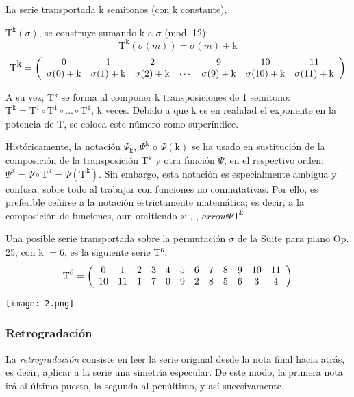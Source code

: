 		La serie transportada k semitonos (con k constante),
		
		$\mbox{T}^{{\mbox{k}}}(\sigma)$, se construye sumando k a $\sigma$ (mod. 12):
		\[\mbox{T}^{{\mbox{k}}}(\sigma(m))=\sigma(m)+{\mbox{k}}\]		
		{\[
		\mbox{T}^{{\mbox{k}}}=
		\left(\begin{array}{*{7}c}
			0&1&2&&9&10&11\\
			\sigma(0)+{\mbox{k}}&\sigma(1)+{\mbox{k}}&\sigma(2)+{\mbox{k}}&
			\cdots&
			\sigma(9)+{\mbox{k}}&\sigma(10)+{\mbox{k}}&\sigma(11)+{\mbox{k}}\\
		\end{array}\right)
		\]}
		
		A su vez, T$^{\mbox{k}}$ se forma al componer k transposiciones de 1 semitono: $\mbox{T}^{\mbox{k}}=\mbox{T}^1\circ\mbox{T}^1\circ\ldots\circ\mbox{T}^1$, k veces. Debido a que k es en realidad el exponente en la potencia de T, se coloca este n\'umero como super\'indice.
		
		Hist\'oricamente, la notaci\'on $\Psi_{\mbox{k}}$, $\Psi^{\mbox{k}}$ o $\Psi({\mbox{k}})$ se ha usado en sustituci\'on de la composici\'on de la transposici\'on T$^{\mbox{k}}$ y otra funci\'on $\Psi$, en el respectivo orden: $\Psi^{\mbox{k}}=\Psi \circ \mbox{T}^{\mbox{k}} = \Psi(\mbox{T}^{\mbox{k}})$. Sin embargo, esta notaci\'on es especialmente ambigua y confusa, sobre todo al trabajar con funciones no conmutativas. Por ello, es preferible ce\~nirse a la notaci\'on estrictamente matem\'atica; es decir, a la composici\'on de funciones, aun omitiendo $\circ$: , ,  $arrow \Psi\mbox{T}^{\mbox{k}}$
		
		Una posible serie transportada sobre la permutaci\'on $\sigma$ de la Suite para piano Op. 25, con k $= 6$, es la siguiente serie T$^6$:
		\[\mbox{T}^6=\drow{10,11,1,7,0,9,2,8,5,6,3,4}\]	
		\begin{center}
			\texttt{[image: 2.png]}
		\end{center}
		
	\subsubsection{Retrogradaci\'on}
		La \emph{retrogradaci\'on} consiste en leer la serie original desde la nota final hacia atr\'as, es decir, aplicar a la serie una simetr\'ia especular. De este modo, la primera nota ir\'a al \'ultimo puesto, la segunda al pen\'ultimo, y as\'i sucesivamente.
		
